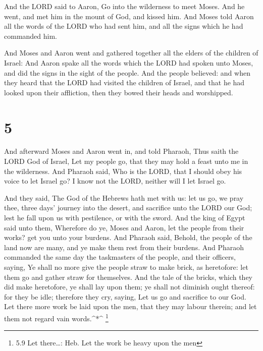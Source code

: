  And the LORD said to Aaron, Go into the wilderness to meet
Moses. And he went, and met him in the mount of God, and kissed him.
 And Moses told Aaron all the words of the LORD who had
sent him, and all the signs which he had commanded him.

 And Moses and Aaron went and gathered together all the
elders of the children of Israel:  And Aaron spake all the
words which the LORD had spoken unto Moses, and did the signs in the
sight of the people.  And the people believed: and when
they heard that the LORD had visited the children of Israel, and that he
had looked upon their affliction, then they bowed their heads and
worshipped.

\hypertarget{section-4}{%
\section{5}\label{section-4}}

 And afterward Moses and Aaron went in, and told Pharaoh,
Thus saith the LORD God of Israel, Let my people go, that they may hold
a feast unto me in the wilderness.  And Pharaoh said, Who is
the LORD, that I should obey his voice to let Israel go? I know not the
LORD, neither will I let Israel go.

 And they said, The God of the Hebrews hath met with us: let
us go, we pray thee, three days' journey into the desert, and sacrifice
unto the LORD our God; lest he fall upon us with pestilence, or with the
sword.  And the king of Egypt said unto them, Wherefore do
ye, Moses and Aaron, let the people from their works? get you unto your
burdens.  And Pharaoh said, Behold, the people of the land
now are many, and ye make them rest from their burdens.  And
Pharaoh commanded the same day the taskmasters of the people, and their
officers, saying,  Ye shall no more give the people straw to
make brick, as heretofore: let them go and gather straw for themselves.
 And the tale of the bricks, which they did make heretofore,
ye shall lay upon them; ye shall not diminish ought thereof: for they be
idle; therefore they cry, saying, Let us go and sacrifice to our God.
 Let there more work be laid upon the men, that they may
labour therein; and let them not regard vain words.\^{}*\^{} \footnote{5.9
  Let there\ldots: Heb. Let the work be heavy upon the men}

